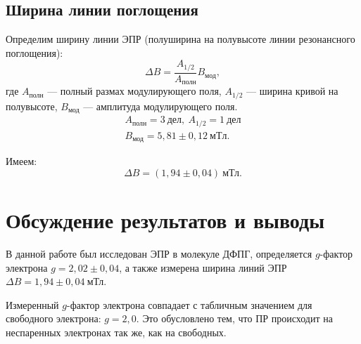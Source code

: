 \documentclass[a4paper, 12pt]{article}
\begin{document}
		\subsection*{Ширина линии поглощения}
	
		Определим ширину линии ЭПР (полуширина на полувысоте линии резонансного поглощения):
		\begin{equation*}
			\Delta B = \frac{A_{1/2}}{A_{\text{полн}}}B_\text{мод},
		\end{equation*}
		где $A_\text{полн}$ --- полный размах модулирующего поля, $A_{1/2}$ --- ширина кривой на полувысоте, $B_\text{мод}$ --- амплитуда модулирующего поля.
		\begin{equation*}
			\begin{gathered}
				A_\text{полн} = 3 \ \text{дел}, \ A_{1/2} = 1 \ \text{дел} \\
				B_\text{мод} = 5,81\pm0,12~мТл.
			\end{gathered}
		\end{equation*}
		
		Имеем:
		\[\boxed{\Delta B = (1,94 \pm 0,04) \ \text{мТл}}.\]
		
\section{Обсуждение результатов и выводы}

В данной работе был исследован ЭПР в молекуле ДФПГ, определяется $g$-фактор электрона $g = 2,02 \pm 0,04$, а также измерена ширина линий ЭПР $\Delta B = 1,94 \pm 0,04~\text{мТл}$.

	Измеренный $g$-фактор электрона совпадает с табличным значением для свободного электрона: $g = 2,0$. Это обусловлено тем, что ПР происходит на неспаренных электронах так же, как на свободных.
\end{document}
